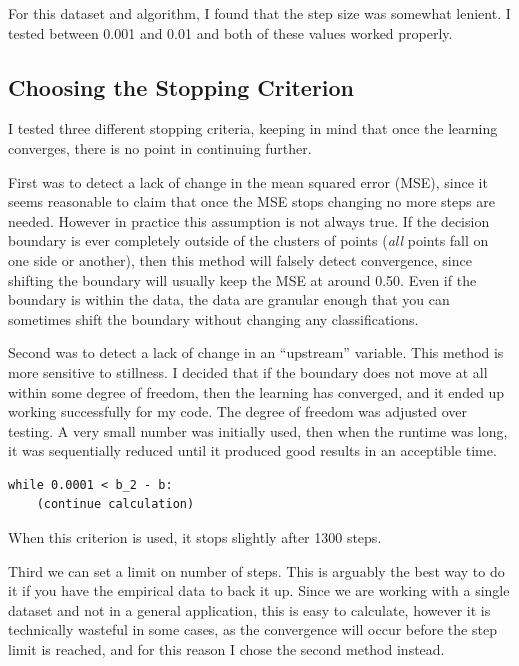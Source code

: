 \documentclass[letterpaper]{article}
\begin{document}
For this dataset and algorithm, I found that the step size was somewhat lenient.
I tested between 0.001 and 0.01 and both of these values worked properly.

\subsection{Choosing the Stopping Criterion}

I tested three different stopping criteria, keeping in mind that once the
learning converges, there is no point in continuing further.

First was to
detect a lack of change in the mean squared error (MSE), since it seems
reasonable to claim that once the MSE stops changing no more steps are needed.
However in practice this assumption is not always true. If the decision boundary
is ever completely outside of the clusters of points (\textit{all} points fall
on one side or another), then this method will falsely detect convergence, since
shifting the boundary will usually keep the MSE at around 0.50. Even if the
boundary is within the data, the data are granular enough that you can sometimes
shift the boundary without changing any classifications.

Second was to detect a lack of change in an ``upstream'' variable. This method
is more sensitive to stillness. I decided that if the boundary does not move
at all within some degree of freedom, then the learning has converged, and it
ended up working successfully for my code. The degree of freedom was adjusted
over testing. A very small number was initially used, then when the runtime was
long, it was sequentially reduced until it produced good results in an
acceptible time.
\begin{verbatim}
while 0.0001 < b_2 - b:
    (continue calculation)
\end{verbatim}
When this criterion is used, it stops slightly after 1300 steps.

Third we can set a limit on number of steps. This is arguably the best way
to do it if you have the empirical data to back it up. Since we are working
with a single dataset and not in a general application, this is easy to
calculate, however it is technically wasteful in some cases, as the
convergence will occur before the step limit is reached, and for this reason
I chose the second method instead.
\end{document}
